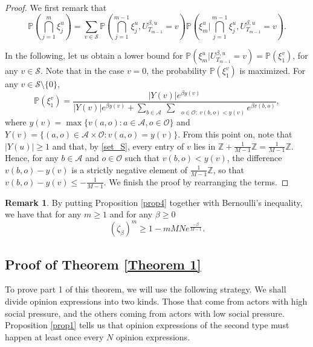 \documentclass[11pt]{article}
\theoremstyle{definition}
\newtheorem{remark}{Remark}
\newcommand{\st}{\mathcal{S}}
\newcommand{\A}{\mathcal{A}}
\newcommand{\opn}{\mathcal{O}}
\def\P{{\mathbb P}}
\begin{document}
\begin{proof}
    We first remark that
    \begin{equation}\label{eq1prop11}
\mathbb{P}\left(\bigcap^m_{j=1}\xi_j^u\right)=\sum_{v\in\st}\mathbb{P}\left(\bigcap^{m-1}_{j=1}\xi_j^u,U^{\beta,u}_{T_{m-1}}=v\right)\mathbb{P}\left(\xi_m^u|\bigcap_{j=1}^{m-1}\xi_j^u, U^{\beta,u}_{T_{m-1}}=v\right).
\end{equation}

In the following, let us obtain a lower bound for $\mathbb{P}\left(\xi_m^u|U^{\beta,u}_{T_{m-1}}=v\right)=\P(\xi_1^v)$, for any $v\in \st$. Note that in the case $v=0$, the probability $\P(\xi_1^v)$ is maximized.
For any $v \in \st \setminus\{0\}$,
$$
\P(\xi_1^v)=\frac{|Y(v)|e^{\beta y(v)}}{|Y(v)|e^{\beta y(v)}+ \displaystyle\sum_{b\in \A}\ \sum_{\quad o\in \opn:\ v(b,o)< y(v)}e^{\beta v(b,o)}},
$$
where
$
y(v)=\max\{v(a,o): a\in \A, o\in \opn\}
$
and
$
Y(v)=\{(a,o) \in \A\times \opn: v(a,o)=y(v)\}.
$ 
From this point on, note that $|Y(u)|\geq 1$ and that, by \eqref{set_S}, every entry of $v$ lies in $\mathbb{Z}+\frac{1}{M-1}\mathbb{Z}=\frac{1}{M-1}\mathbb{Z}$. Hence, for any $b \in \A$ and $o\in\opn$ such that $v(b,o)< y(v)$, the difference $v(b,o)-y(v)$ is a strictly negative element of $\frac{1}{M-1}\mathbb{Z}$, so that $v(b,o)-y(v)\leq -\frac{1}{M-1}$. We finish the proof by rearranging the terms.
\end{proof}

\begin{remark} \label{remark:bernoulli}
By putting Proposition \ref{prop4}  together with Bernoulli's inequality, we have that for any $m\geq 1$ and for any $\beta\geq 0$
$$
(\zeta_{\beta})^m \geq 1-mMNe^{\frac{-\beta}{M-1}}.
$$
\end{remark}

\subsection{Proof of Theorem \ref{Theorem 1}} \label{subsec:T1}

To prove part 1 of this theorem, we will use the following strategy. We shall divide opinion expressions into two kinds. Those that come from actors with high social pressure, and the others coming from actors with low social pressure. Proposition \ref{prop1} tells us that opinion expressions of the second type must happen at least once every $N$ opinion expressions.
\end{document}
